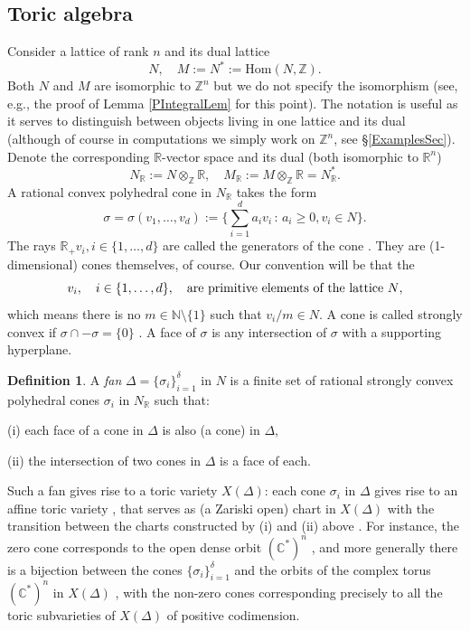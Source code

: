 \documentclass{article}
\newcommand{\CC}{\mathbb {C}}
\newcommand{\NN}{{\mathbb N}}
\newcommand{\RR}{{\mathbb R}}
\newcommand{\ZZ}{{\mathbb Z}}
\renewcommand{\>}{\rightarrow}
\theoremstyle{plain}
\theoremstyle{definition}
\newtheorem{definition}[theorem]{Definition}
\newcommand{\beq}{\begin{equation}}
\newcommand{\eeq}{\end{equation}}
\newcommand{\bdefn}{\begin{definition}}
\newcommand{\edefn}{\end{definition}}
\def\lb#1{\label{#1}}
\def\q{\quad}
\begin{document}
\subsection{Toric algebra}

Consider a lattice of rank $n$ and its dual lattice 
\beq
\lb{NMHomEq}
N, \quad
M:=N^*:=
\mathrm{Hom}(N,\ZZ).
\eeq
Both $N$ and $M$ are isomorphic to $\ZZ^n$ but we do not specify
the isomorphism (see, e.g., the proof of Lemma \ref{PIntegralLem}
for this point). The notation
is useful as it serves to distinguish
between objects living in one
lattice and its dual (although of
course in computations
we simply work on $\ZZ^n$, see \S\ref{ExamplesSec}).
Denote the corresponding 
$\RR$-vector space and its dual (both isomorphic to $\RR^n$)
\beq
\lb{NRMREq}
N_\RR:=
N\otimes_\ZZ\RR,
\quad
M_\RR:=M\otimes_\ZZ\RR=N_\RR^*. 
\eeq
A rational convex polyhedral cone in $N_\RR$ takes the form
\beq
\lb{conefirstEq}
\sigma=\sigma(v_1,\ldots,v_d):=
\Big\{
{\textstyle\sum}_{i=1}^da_iv_i\,:\, a_i\ge0, v_i\in N
\Big\}.
\eeq
The rays $\RR_{+}v_i, i\in\{1,\ldots,d\}$ are called the generators
of the cone \cite[p. 9]{Ful}. 
They are (1-dimensional) cones themselves, of course.
Our convention will be that the 
\beq
\lb{conventionprimitiveEq}
v_i, \quad i\in\{1,\ldots,d\}, \q
\hbox{are primitive elements 
of the lattice $N$},
\eeq
which means there is no $m\in \NN\setminus\{1\}$ such that 
$v_i/m\in N$.
A cone is called strongly convex if
$\sigma\cap -\sigma =\{0\}$ \cite[p. 14]{Ful}.
A face of $\sigma$ is any intersection of $\sigma$
with a supporting hyperplane.

\bdefn
\label{FanDefn}
A {\it fan} $\Delta=\{\sigma_i\}_{i=1}^\delta$ in $N$ is a finite set of rational strongly convex polyhedral
cones $\sigma_i$ in $N_\RR$ such that: 

\smallskip
\noindent 
(i) each face of a cone in $\Delta$ is also (a cone) in $\Delta$,

\smallskip
\noindent
(ii) the intersection of two cones in $\Delta$ is a face of each. 
\edefn

Such a fan gives rise to a toric variety $X(\Delta)$: 
each cone $\sigma_i$ in $\Delta$ gives rise to an affine toric variety \cite[\S1.3]{Ful},
that serves as (a Zariski open) chart in $X(\Delta)$ with the transition
between the charts constructed by (i) and (ii) above \cite[p. 21]{Ful}.
For instance, the zero cone corresponds to the open dense orbit
$(\CC^*)^n$ \cite[p. 64]{Cannas}, and more generally there is a
bijection between the cones $\{\sigma_i\}_{i=1}^\delta$ and the orbits
of the complex torus $(\CC^*)^n$ in $X(\Delta)$
\cite[Proposition 5.6.2]{Cannas}, with 
the non-zero cones corresponding precisely to 
all the toric subvarieties of $X(\Delta)$ of positive codimension.
\end{document}
